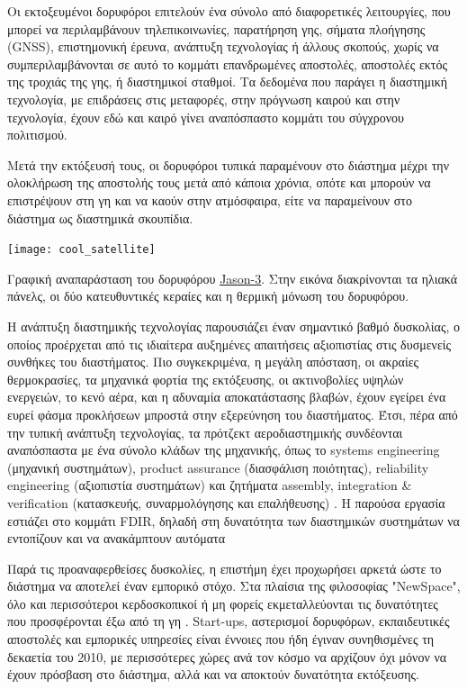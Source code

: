 \documentclass[a4paper,nobib]{tufte-book}
\begin{document}
Οι εκτοξευμένοι δορυφόροι επιτελούν ένα σύνολο από διαφορετικές λειτουργίες, που μπορεί να περιλαμβάνουν τηλεπικοινωνίες, παρατήρηση γης, σήματα πλοήγησης (\acs{GNSS}), επιστημονική έρευνα, ανάπτυξη τεχνολογίας ή άλλους σκοπούς, χωρίς να συμπεριλαμβάνονται σε αυτό το κομμάτι επανδρωμένες αποστολές, αποστολές εκτός της τροχιάς της γης, ή διαστημικοί σταθμοί. Τα δεδομένα που παράγει η διαστημική τεχνολογία, με επιδράσεις στις μεταφορές, στην πρόγνωση καιρού και στην τεχνολογία, έχουν εδώ και καιρό γίνει αναπόσπαστο κομμάτι του σύγχρονου πολιτισμού.

Μετά την εκτόξευσή τους, οι δορυφόροι τυπικά παραμένουν στο διάστημα μέχρι την ολοκλήρωση της αποστολής τους μετά από κάποια χρόνια, οπότε και μπορούν να επιστρέψουν στη γη και να καούν στην ατμόσφαιρα, είτε να παραμείνουν στο διάστημα ως διαστημικά σκουπίδια.

\begin{marginfigure}
	\texttt{[image: cool\_satellite]}
	\caption[Γραφική αναπαράσταση του δορυφόρου Jason-3]{Γραφική αναπαράσταση του δορυφόρου \href{https://www.flickr.com/photos/noaasatellites/16979948568}{Jason-3}. Στην εικόνα διακρίνονται τα ηλιακά πάνελς, οι δύο κατευθυντικές κεραίες και η θερμική μόνωση του δορυφόρου.}
\end{marginfigure}

Η ανάπτυξη διαστημικής τεχνολογίας παρουσιάζει έναν σημαντικό βαθμό δυσκολίας, ο οποίος προέρχεται από τις ιδιαίτερα αυξημένες απαιτήσεις αξιοπιστίας στις δυσμενείς συνθήκες του διαστήματος. Πιο συγκεκριμένα, η μεγάλη απόσταση, οι ακραίες θερμοκρασίες, τα μηχανικά φορτία της εκτόξευσης, οι ακτινοβολίες υψηλών ενεργειών, το κενό αέρα,  και η αδυναμία αποκατάστασης βλαβών, έχουν εγείρει ένα ευρεί φάσμα προκλήσεων μπροστά στην εξερεύνηση του διαστήματος. Έτσι, πέρα από την τυπική ανάπτυξη τεχνολογίας, τα πρότζεκτ αεροδιαστημικής συνδέονται αναπόσπαστα με ένα σύνολο κλάδων της μηχανικής, όπως το systems engineering (μηχανική συστημάτων), product assurance (διασφάλιση ποιότητας), reliability engineering (αξιοπιστία συστημάτων) και ζητήματα assembly, integration \& verification (κατασκευής, συναρμολόγησης και επαλήθευσης) \autocite{smad}. Η παρούσα εργασία εστιάζει στο κομμάτι \acf{FDIR}, δηλαδή στη δυνατότητα των διαστημικών συστημάτων να εντοπίζουν και να ανακάμπτουν αυτόματα 

Παρά τις προαναφερθείσες δυσκολίες, η επιστήμη έχει προχωρήσει αρκετά ώστε το διάστημα να αποτελεί έναν εμπορικό στόχο. Στα πλαίσια της φιλοσοφίας "NewSpace", όλο και περισσότεροι κερδοσκοπικοί ή μη φορείς εκμεταλλεύονται τις δυνατότητες που προσφέρονται έξω από τη γη \autocite{denis_new_space_2020}. Start-ups, αστερισμοί δορυφόρων, εκπαιδευτικές αποστολές και εμπορικές υπηρεσίες είναι έννοιες που ήδη έγιναν συνηθισμένες τη δεκαετία του 2010, με περισσότερες χώρες ανά τον κόσμο να αρχίζουν όχι μόνον να έχουν πρόσβαση στο διάστημα, αλλά και να αποκτούν δυνατότητα εκτόξευσης.
\end{document}
